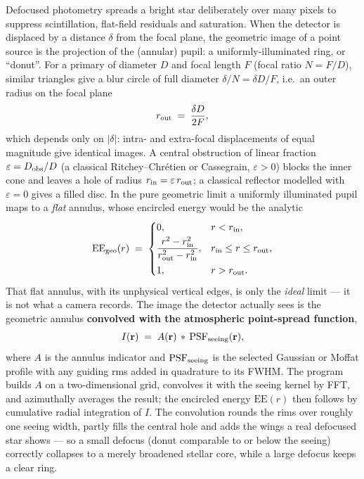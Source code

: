 Defocused photometry spreads a bright star deliberately over many pixels to
suppress scintillation, flat-field residuals and saturation. When the
detector is displaced by a distance $\delta$ from the focal plane, the
geometric image of a point source is the projection of the (annular) pupil:
a uniformly-illuminated ring, or ``donut''. For a primary of diameter $D$
and focal length $F$ (focal ratio $N = F/D$), similar triangles give a blur
circle of full diameter $\delta/N = \delta D/F$, i.e.\ an outer radius on the
focal plane
\begin{equation}
  r_{\rm out} \;=\; \frac{\delta D}{2F},
\end{equation}
which depends only on $|\delta|$: intra- and extra-focal displacements of
equal magnitude give identical images. A central obstruction of linear
fraction $\varepsilon = D_{\rm obs}/D$ (a classical Ritchey--Chr\'etien or
Cassegrain, $\varepsilon>0$) blocks the inner cone and leaves a hole of
radius $r_{\rm in} = \varepsilon\,r_{\rm out}$; a classical reflector modelled
with $\varepsilon = 0$ gives a filled disc. In the pure geometric limit a
uniformly illuminated pupil maps to a \emph{flat} annulus, whose encircled
energy would be the analytic
\begin{equation}
  \mathrm{EE}_{\rm geo}(r) \;=\;
  \begin{cases}
    0, & r < r_{\rm in},\\[2pt]
    \dfrac{r^2 - r_{\rm in}^2}{r_{\rm out}^2 - r_{\rm in}^2}, & r_{\rm in} \le r \le r_{\rm out},\\[8pt]
    1, & r > r_{\rm out}.
  \end{cases}
\end{equation}
That flat annulus, with its unphysical vertical edges, is only the
\emph{ideal} limit --- it is not what a camera records. The image the
detector actually sees is the geometric annulus \textbf{convolved with the
atmospheric point-spread function},
\begin{equation}
  I(\mathbf{r}) \;=\; A(\mathbf{r}) \,\ast\, \mathrm{PSF}_{\rm seeing}(\mathbf{r}),
\end{equation}
where $A$ is the annulus indicator and $\mathrm{PSF}_{\rm seeing}$ is the
selected Gaussian or Moffat profile with any guiding rms added in quadrature
to its FWHM. The program builds $A$ on a two-dimensional grid, convolves it
with the seeing kernel by FFT, and azimuthally averages the result; the
encircled energy $\mathrm{EE}(r)$ then follows by cumulative radial
integration of $I$. The convolution rounds the rims over roughly one seeing
width, partly fills the central hole and adds the wings a real defocused
star shows --- so a small defocus (donut comparable to or below the seeing)
correctly collapses to a merely broadened stellar core, while a large
defocus keeps a clear ring.

